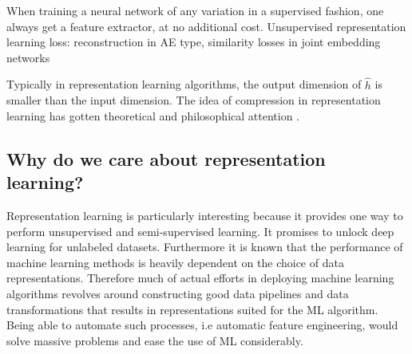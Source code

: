 \documentclass[../../thesis.tex]{subfiles}
\begin{document}
When training a neural network of any variation in a supervised fashion, one always get a feature extractor, at no additional cost.  
Unsupervised representation learning loss: reconstruction in AE type, similarity losses in joint embedding networks


Typically in representation learning algorithms, the output dimension of $\widehat{h}$ is smaller than the input dimension. The idea of compression in representation learning has gotten theoretical and philosophical attention . 









\subsection{Why do we care about representation learning?}
Representation learning is particularly interesting because it provides one way to perform unsupervised and semi-supervised learning. It promises to unlock deep learning for unlabeled datasets. Furthermore it is known that the performance of machine learning methods is heavily dependent on the choice of data representations. Therefore much of actual efforts in deploying machine learning algorithms revolves around constructing good data pipelines and data transformations that results in representations suited for the ML algorithm. Being able to automate such processes, i.e automatic feature engineering, would solve massive problems and ease the use of ML considerably. 
\end{document}
